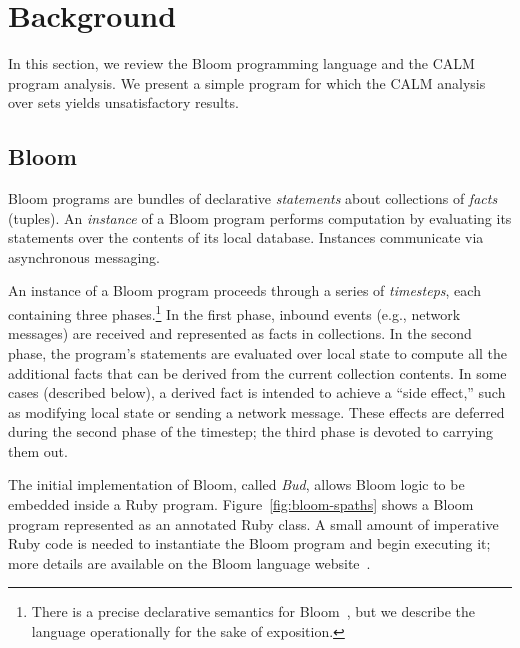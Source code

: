 \section{Background}
\label{sec:background}

In this section, we review the Bloom programming language and the CALM program
analysis.  We present a simple program for which the CALM analysis over sets
yields unsatisfactory results.

\subsection{Bloom}
\label{sec:bg-bloom}

Bloom programs are bundles of declarative \emph{statements} about collections of
\emph{facts} (tuples). An \emph{instance} of a Bloom program performs
computation by evaluating its statements over the contents of its local
database. Instances communicate via asynchronous messaging.

An instance of a Bloom program proceeds through a series of \emph{timesteps},
each containing three phases.\footnote{There is a precise declarative semantics
  for Bloom~\cite{dedalus-semantics,dedalus}, but we describe the language
  operationally for the sake of exposition.} In the first phase, inbound events
(e.g., network messages) are received and represented as facts in
collections. In the second phase, the program's statements are evaluated over
local state to compute all the additional facts that can be derived from the
current collection contents. In some cases (described below), a derived fact is
intended to achieve a ``side effect,'' such as modifying local state or sending
a network message.  These effects are deferred during the second phase of the
timestep; the third phase is devoted to carrying them out.

The initial implementation of Bloom, called \emph{Bud}, allows Bloom logic to be
embedded inside a Ruby program. Figure~\ref{fig:bloom-spaths} shows a Bloom
program represented as an annotated Ruby class. A small amount of imperative
Ruby code is needed to instantiate the Bloom program and begin executing it;
more details are available on the Bloom language website~\cite{bloom}.


